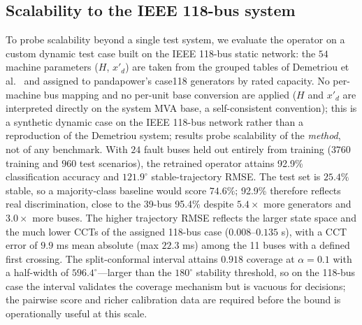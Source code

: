 \documentclass[5p,times]{elsarticle}
\newcommand{\pctACC}{95.4\%}          %
\newcommand{\pctACCb}{92.9\%}         %
\begin{document}
\subsection{Scalability to the IEEE 118-bus system}
To probe scalability beyond a single test system, we evaluate the operator on a custom dynamic
test case built on the IEEE 118-bus static network: the $54$ machine parameters ($H$, $x'_{d}$)
are taken from the grouped tables of Demetriou et al.~\cite{demetriou2017dynamic} and assigned to
pandapower's case118 generators by rated capacity. No per-machine bus mapping and no per-unit
base conversion are applied ($H$ and $x'_{d}$ are interpreted directly on the system MVA base,
a self-consistent convention); this is a synthetic dynamic case on the IEEE 118-bus network
rather than a reproduction of the Demetriou system; results probe scalability of the
\emph{method}, not of any benchmark. With $24$ fault buses held out entirely from training
($3760$ training and $960$ test scenarios), the retrained operator attains \pctACCb{}
classification accuracy and $121.9^\circ$ stable-trajectory RMSE. The test set is $25.4\%$
stable, so a majority-class baseline would score $74.6\%$; \pctACCb{} therefore reflects real
discrimination, close to the 39-bus \pctACC{} despite $5.4\times$ more generators and $3.0\times$
more buses. The higher trajectory RMSE reflects the larger state space and the much lower CCTs of
the assigned 118-bus case ($0.008$--$0.135$ s), with a CCT error of $9.9$ ms mean absolute (max
$22.3$ ms) among the 11 buses with a defined first crossing. The split-conformal interval attains $0.918$ coverage at
$\alpha{=}0.1$ with a half-width of $596.4^\circ$---larger than the $180^\circ$ stability
threshold, so on the 118-bus case the interval validates the coverage mechanism but is vacuous
for decisions; the pairwise score and richer calibration data
are required before the bound is operationally useful at this scale.
\end{document}
